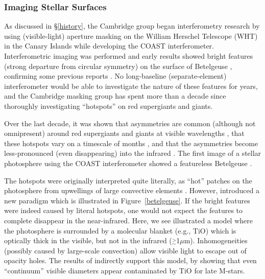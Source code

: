 \documentclass[12pt]{article}
\newcommand{\simge}{\mbox{$\stackrel{>}{_{\sim}}$}}
\begin{document}
\subsubsection{Imaging Stellar Surfaces}
\label{hotspots}
As discussed in \S\ref{history}, the Cambridge group began
interferometry research by using (visible-light) aperture masking on
the William Herschel Telescope (WHT) in the Canary Islands
\citep{baldwin1986,haniff1987} while developing the COAST
interferometer.  Interferometric imaging was performed and early
results showed bright features (strong departure from circular
symmetry) on the surface of Betelgeuse \citep{buscher1990}, confirming
some previous reports \citep[e.g.,][]{roddier1983}.  No long-baseline
(separate-element) interferometer would be able to investigate the
nature of these features for years, and the Cambridge masking group
has spent more than a decade since thoroughly investigating
``hotspots'' on red supergiants and giants.

Over the last decade, it was shown that asymmetries are common
(although not omnipresent) around red supergiants and giants at visible
wavelengths \citep{wilson1992,tuthill1997,tuthill1999a}, that these
hotspots vary on a timescale of months \citep{wilson1997}, and that the
asymmetries become less-pronounced (even disappearing) into the
infrared \citep{young2000b}.  The first image of a stellar photosphere
using the COAST interferometer showed a featureless Betelgeuse
\citep{burns1997}.

The hotspots were originally interpreted quite literally, as ``hot''
patches on the photosphere from upwellings of large convective
elements \citep{schwarzschild1975}.  However, \citet{young2000b}
introduced a new paradigm which is illustrated in
Figure~\ref{betelgeuse}. If the bright features were indeed caused by
literal hotspots, one would not expect the features to complete
disappear in the near-infrared.  Here, we see illustrated a model where
the photosphere is surrounded by a molecular blanket (e.g., TiO) which
is optically thick in the visible, but not in the infrared
($\simge$1$\mu$m).  Inhomogeneities (possibly caused by large-scale
convection) allow visible light to escape out of opacity holes.  The
results of \cite{dyck2002} indirectly support this model, by showing
that even ``continuum'' visible diameters appear contaminated by TiO
for late M-stars.
\end{document}
